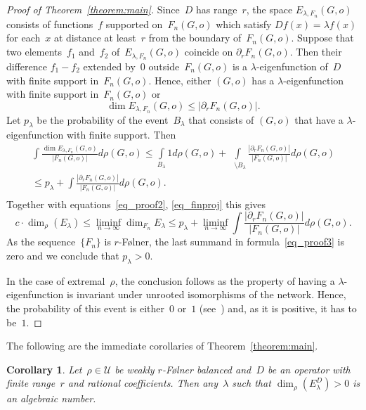 \documentclass[english]{article}
\newtheorem{corollary}[lemma]{Corollary}
\theoremstyle{definition}
\DeclareMathOperator{\Gr}{{\mathcal{G}_*}}
\begin{document}
\begin{proof}[Proof of Theorem~\ref{theorem:main}]
    Since~$D$ has range~$r$, the space $E_{\lambda, F_n}(G,o)$ consists of functions~$f$ supported on~$F_n(G,o)$ which satisfy $Df(x) = \lambda f(x)$ for each~$x$ at distance at least~$r$ from the boundary of~$F_n(G,o)$. Suppose that two elements~$f_1$ and~$f_2$ of~$E_{\lambda,F_n}(G,o)$ coincide on $\partial_r F_n(G,o)$. Then their difference $f_1 - f_2$ extended by~$0$ outside~$F_n(G,o)$ is a $\lambda$-eigenfunction of~$D$ with finite support in~$F_n(G,o)$. Hence, either $(G,o)$ has a $\lambda$-eigenfunction with finite support in~$F_n(G,o)$ or 
    $$
    \dim {E_{\lambda,F_n}}(G,o) \le |\partial_r F_n(G,o)|.
    $$
    Let $p_\lambda$ be the probability of the event~$B_\lambda$ that consists of $(G,o)$ that have a $\lambda$-eigenfunction with finite support. Then
    \begin{multline*}
      \int\limits_{\Gr} \frac{\dim {E_{\lambda,F_n}}(G,o)}{|F_n(G,o)|} d \rho (G,o) \le 
    \int\limits_{B_\lambda} 1 d \rho (G,o) + 
    \int\limits_{\Gr \setminus B_\lambda} \frac{|\partial_r F_n(G,o)|}{|F_n(G,o)|} d \rho (G,o) \\ \le
    p_\lambda + \int\limits_{\Gr}\frac{|\partial_r F_n(G,o)|}{|F_n(G,o)|} d \rho(G,o).  
    \end{multline*}
    Together with equations~\eqref{eq_proof2}, \eqref{eq_finproj} this gives
    \begin{equation}\label{eq_proof3}
        c \cdot \dim_\rho (E_\lambda) \le 
        \liminf_{n \to \infty}\dim_{F_n} E_\lambda \le p_\lambda + \liminf_{n \to \infty} \int\frac{|\partial_r F_n(G,o)|}{|F_n(G,o)|} d \rho(G,o).
    \end{equation}
    As the sequence~$\{F_n\}$ is $r$-F\o lner, the last summand in formula~\eqref{eq_proof3} is zero and we conclude that $p_\lambda > 0$. 
    
    In the case of extremal~$\rho$, the conclusion follows as the property of having a $\lambda$-eigenfunction is invariant under unrooted isomorphisms of the network. Hence, the probability of this event is either~$0$ or~$1$ (see~\cite{AL07}) and, as it is positive, it has to be~$1$. 
\end{proof}

    The following are the immediate corollaries of Theorem~\ref{theorem:main}. 
    
\begin{corollary}\label{corollary:algebraic}
    Let~$\rho \in \mathcal{U}$ be weakly $r$-{F\o lner} balanced and~$D$ be an  operator with finite range~$r$ and rational coefficients. Then any~$\lambda$ such that $\dim_\rho(E^D_\lambda) > 0$ is an algebraic number. 
\end{corollary}
\end{document}

